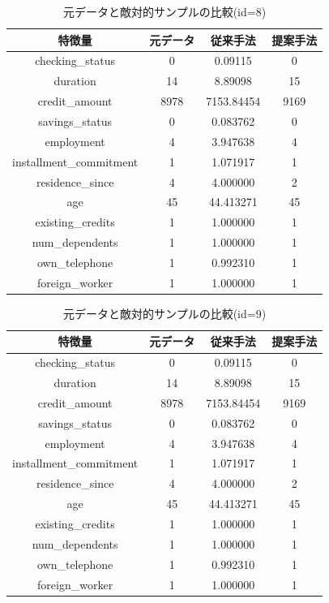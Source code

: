 \begin{table}[H]
    \centering
    \caption{元データと敵対的サンプルの比較(id=8)}
    \begin{tabular}{|c|c|c|c|} \hline
        特徴量 & 元データ & 従来手法 & 提案手法 \\ \hline
        checking\_status & 0 & 0.09115 & 0\\ \hline
        duration & 14 & 8.89098 & 15 \\ \hline
        credit\_amount & 8978 & 7153.84454 & 9169 \\ \hline
        savings\_status & 0 & 0.083762 & 0\\ \hline
        employment & 4 & 3.947638  & 4 \\ \hline
        installment\_commitment & 1 & 1.071917 & 1\\ \hline
        residence\_since & 4 & 4.000000 & 2 \\ \hline
        age & 45 & 44.413271 & 45 \\ \hline
        existing\_credits & 1 & 1.000000 & 1 \\ \hline
        num\_dependents & 1 & 1.000000 & 1 \\ \hline
        own\_telephone & 1 & 0.992310 & 1 \\ \hline
        foreign\_worker & 1 & 1.000000 & 1 \\ \hline
    \end{tabular}
\end{table}

\begin{table}[H]
    \centering
    \caption{元データと敵対的サンプルの比較(id=9)}
    \begin{tabular}{|c|c|c|c|} \hline
        特徴量 & 元データ & 従来手法 & 提案手法 \\ \hline
        checking\_status & 0 & 0.09115 & 0\\ \hline
        duration & 14 & 8.89098 & 15 \\ \hline
        credit\_amount & 8978 & 7153.84454 & 9169 \\ \hline
        savings\_status & 0 & 0.083762 & 0\\ \hline
        employment & 4 & 3.947638  & 4 \\ \hline
        installment\_commitment & 1 & 1.071917 & 1\\ \hline
        residence\_since & 4 & 4.000000 & 2 \\ \hline
        age & 45 & 44.413271 & 45 \\ \hline
        existing\_credits & 1 & 1.000000 & 1 \\ \hline
        num\_dependents & 1 & 1.000000 & 1 \\ \hline
        own\_telephone & 1 & 0.992310 & 1 \\ \hline
        foreign\_worker & 1 & 1.000000 & 1 \\ \hline
    \end{tabular}
\end{table}

